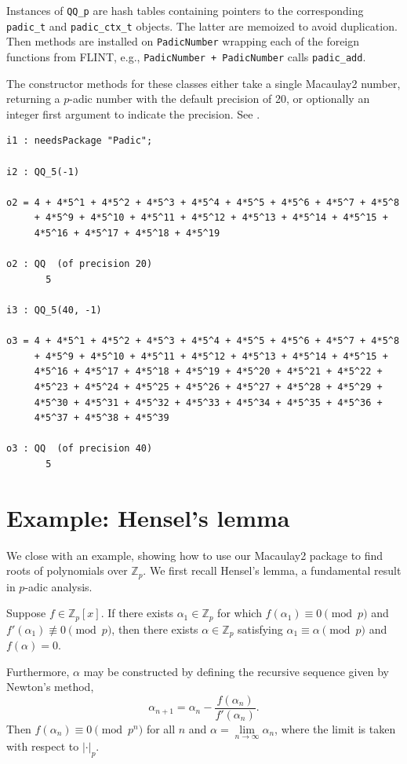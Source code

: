 \documentclass[runningheads]{llncs}
\newcommand{\QQ}{\mathbb Q}
\newcommand{\ZZ}{\mathbb Z}
\begin{document}
Instances of \texttt{QQ\_p} are hash tables containing pointers to the corresponding \texttt{padic\_t} and \texttt{padic\_ctx\_t} objects.  The latter are memoized to avoid duplication.  Then methods are installed on \texttt{PadicNumber} wrapping each of the foreign functions from FLINT, e.g., \texttt{PadicNumber + PadicNumber} calls \texttt{padic\_add}.

The constructor methods for these classes either take a single Macaulay2 number, returning a $p$-adic number with the default precision of 20, or optionally an integer first argument to indicate the precision.  See .

\begin{listing}[htbp!]
\begin{verbatim}
i1 : needsPackage "Padic";

i2 : QQ_5(-1)

o2 = 4 + 4*5^1 + 4*5^2 + 4*5^3 + 4*5^4 + 4*5^5 + 4*5^6 + 4*5^7 + 4*5^8
     + 4*5^9 + 4*5^10 + 4*5^11 + 4*5^12 + 4*5^13 + 4*5^14 + 4*5^15 +
     4*5^16 + 4*5^17 + 4*5^18 + 4*5^19

o2 : QQ  (of precision 20)
       5

i3 : QQ_5(40, -1)

o3 = 4 + 4*5^1 + 4*5^2 + 4*5^3 + 4*5^4 + 4*5^5 + 4*5^6 + 4*5^7 + 4*5^8
     + 4*5^9 + 4*5^10 + 4*5^11 + 4*5^12 + 4*5^13 + 4*5^14 + 4*5^15 +
     4*5^16 + 4*5^17 + 4*5^18 + 4*5^19 + 4*5^20 + 4*5^21 + 4*5^22 +
     4*5^23 + 4*5^24 + 4*5^25 + 4*5^26 + 4*5^27 + 4*5^28 + 4*5^29 +
     4*5^30 + 4*5^31 + 4*5^32 + 4*5^33 + 4*5^34 + 4*5^35 + 4*5^36 +
     4*5^37 + 4*5^38 + 4*5^39

o3 : QQ  (of precision 40)
       5
\end{verbatim}
\caption{Constructing $-1\in\QQ_5$ with different precisions}
\label{constructor methods}
\end{listing}
\section{Example: Hensel's lemma}\label{hensel example}

We close with an example, showing how to use our Macaulay2 package to find roots of polynomials over $\ZZ_p$.  We first recall Hensel's lemma, a fundamental result in $p$-adic analysis.  

\begin{lemma}
  Suppose $f\in\ZZ_p[x]$.  If there exists $\alpha_1\in\ZZ_p$ for which $f(\alpha_1)\equiv 0\pmod p$ and $f'(\alpha_1)\not\equiv 0\pmod p$, then there exists $\alpha\in\ZZ_p$ satisfying $\alpha_1\equiv\alpha\pmod p$ and $f(\alpha)=0$.

  Furthermore, $\alpha$ may be constructed by defining the recursive sequence given by Newton's method,
  \begin{equation*}
    \alpha_{n+1} = \alpha_n - \frac{f(\alpha_n)}{f'(\alpha_n)}.
  \end{equation*}
Then $f(\alpha_n)\equiv 0\pmod{p^n}$ for all $n$ and $\alpha=\lim\limits_{n\to\infty}\alpha_n$, where the limit is taken with respect to $|\cdot|_p$.
\end{lemma}
\end{document}
